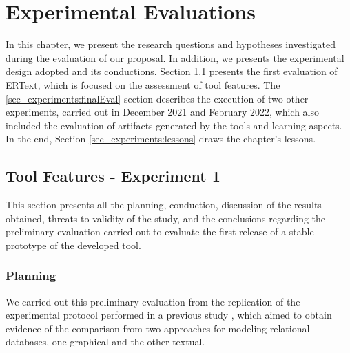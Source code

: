 \chapter{Experimental Evaluations}\label{chap:experiments}

In this chapter, we present the research questions and hypotheses investigated during the evaluation of our proposal. 
In addition, we presents the experimental design adopted and its conductions.
Section \ref{sec_experiments:preliminaryEval} presents the first evaluation of ERText, which is focused on the assessment of tool features. 
The \ref{sec_experiments:finalEval} section describes the execution of two other experiments, carried out in December 2021 and February 2022, which also included the evaluation of artifacts generated by the tools and learning aspects.
In the end, Section \ref{sec_experiments:lessons} draws the chapter's lessons.

\section{Tool Features - Experiment 1} 
\label{sec_experiments:preliminaryEval}

This section presents all the planning, conduction, discussion of the results obtained, threats to validity of the study, and the conclusions regarding the preliminary evaluation carried out to evaluate the first release of a stable prototype of the developed tool.

\subsection{Planning}
\label{ssec_experiments:preliminary_planning}

We carried out this preliminary evaluation from the replication of the experimental protocol performed in a previous study \cite{Lopes:2019}, which aimed to obtain evidence of the comparison from two approaches for modeling relational databases, one graphical and the other textual.

